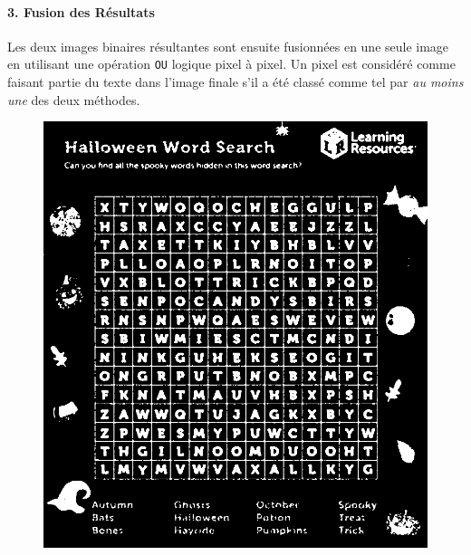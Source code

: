 \documentclass{article}
\begin{document}
\paragraph{3. Fusion des Résultats}
Les deux images binaires résultantes sont ensuite fusionnées en une seule image en utilisant une opération \texttt{OU} logique pixel à pixel. Un pixel est considéré comme faisant partie du texte dans l'image finale s'il a été classé comme tel par \textit{au moins une} des deux méthodes.
\begin{figure}[H]
  \centering
      \includegraphics[width=\linewidth]{ressources/image_2_word_detection_06_combined_threshold.png}
      \caption{}
    \endminipage\quad\quad\quad\quad

\end{figure}
\end{document}
